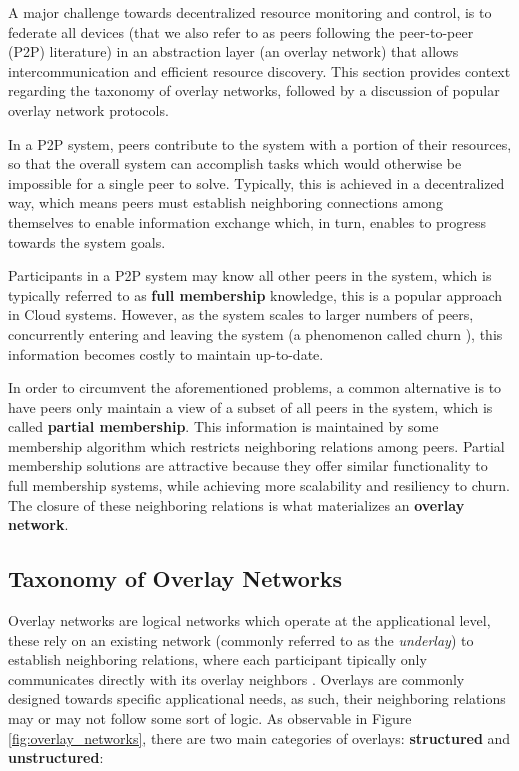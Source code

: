 

A major challenge towards decentralized resource monitoring and control, is to federate all devices (that we also refer to as peers following the peer-to-peer (P2P) literature) in an abstraction layer (an overlay network) that allows intercommunication and efficient resource discovery. This section provides context regarding the taxonomy of overlay networks, followed by a discussion of popular overlay network protocols.

In a P2P system, peers contribute to the system with a portion of their resources, so that the overall system can accomplish tasks which would otherwise be impossible for a single peer to solve. Typically, this is achieved in a decentralized way, which means peers must establish neighboring connections among themselves to enable information exchange which, in turn, enables to progress towards the system goals. 

Participants in a P2P system may know all other peers in the system, which is typically referred to as \textbf{full membership} knowledge, this is a popular approach in Cloud systems. However, as the system scales to larger numbers of peers, concurrently entering and leaving the system (a phenomenon called churn \cite{stutzbach2006understanding}), this information becomes costly to maintain up-to-date. 

In order to circumvent the aforementioned problems, a common alternative is to have peers only maintain a view of a subset of all peers in the system, which is called \textbf{partial membership}. This information is maintained by some membership algorithm which restricts neighboring relations among peers. Partial membership solutions are attractive because they offer similar functionality to full membership systems, while achieving more scalability and resiliency to churn. The closure of these neighboring relations is what materializes an \textbf{overlay network}.

\subsection{Taxonomy of Overlay Networks}

Overlay networks are logical networks which operate at the applicational level, these rely on an existing network (commonly referred to as the \textit{underlay}) to establish neighboring relations, where each participant tipically only communicates directly with its overlay neighbors \cite{leitaoPHDthesis}. Overlays are commonly designed towards specific applicational needs, as such, their neighboring relations may or may not follow some sort of logic. As observable in Figure \ref{fig:overlay_networks}, there are two main categories of overlays: \textbf{structured} and \textbf{unstructured}:

